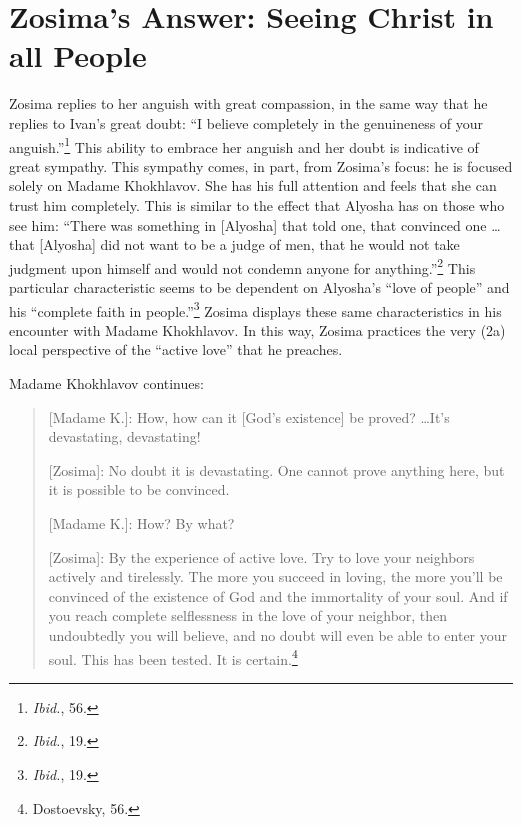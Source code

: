 \section{Zosima's Answer: Seeing Christ in all People}
Zosima replies to her anguish with great compassion, in the same way that he replies to Ivan's great doubt: ``I believe completely in the genuineness of your anguish.''\footnote{\emph{Ibid.}, 56.} This ability to embrace her anguish and her doubt is indicative of great sympathy. This sympathy comes, in part, from Zosima's focus: he is focused solely on Madame Khokhlavov. She has his full attention and feels that she can trust him completely. This is similar to the effect that Alyosha has on those who see him: ``There was something in [Alyosha] that told one, that convinced one \ldots that [Alyosha] did not want to be a judge of men, that he would not take judgment upon himself and would not condemn anyone for anything.''\footnote{\emph{Ibid.}, 19.} This particular characteristic seems to be dependent on Alyosha's ``love of people'' and his ``complete faith in people.''\footnote{\emph{Ibid.}, 19.} Zosima displays these same characteristics in his encounter with Madame Khokhlavov. In this way, Zosima practices the very (2a) local perspective of the ``active love'' that he preaches.

Madame Khokhlavov continues:
\begin{quote}
[Madame K.]: How, how can it [God's existence] be proved? \ldots It's devastating, devastating!

[Zosima]: No doubt it is devastating. One cannot prove anything here, but it is possible to be convinced.

[Madame K.]: How? By what?

[Zosima]: By the experience of active love. Try to love your neighbors actively and tirelessly. The more you succeed in loving, the more you'll be convinced of the existence of God and the immortality of your soul. And if you reach complete selflessness in the love of your neighbor, then undoubtedly you will believe, and no doubt will even be able to enter your soul. This has been tested. It is certain.\footnote{Dostoevsky, 56.}
\end{quote}

